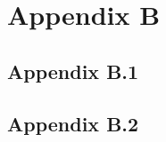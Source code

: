 
\clearpage
\section*{Appendix B}
\label{sec:appendix-b}


\subsection*{Appendix B.1}
\label{sec:appendix-b1}

\lipsum[1]

\subsection*{Appendix B.2}
\label{sec:appendix-b2}

\lipsum[1]


